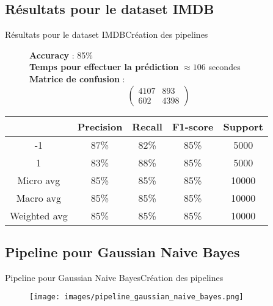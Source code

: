 \documentclass[usenames,dvipsnames]{beamer}
\begin{document}
\subsection{Résultats pour le dataset IMDB}
\begin{frame}{Résultats pour le dataset IMDB}{Création des pipelines}
\begin{figure}[!ht]
  \centering
  \textbf{Accuracy} : 85\% \\
  \textbf{Temps pour effectuer la prédiction} $\approx106$ secondes \\
  \textbf{Matrice de confusion} :
  $$
  \begin{pmatrix}
  4107 & 893 \\
  602 & 4398
  \end{pmatrix}
  $$
\end{figure}

\begin{table}
  \centering
  \begin{tabular}{|c||c|c|c|c|}
    \hline
     & \textbf{Precision} & \textbf{Recall} & \textbf{F1-score} & \textbf{Support}\\
    \hline
    \hline
    -1 & 87\% & 82\% & 85\% & 5000\\
    \hline
    1 & 83\% & 88\% & 85\% & 5000\\
    \hline
    Micro avg & 85\% & 85\% & 85\% & 10000\\
    \hline
    Macro avg & 85\% & 85\% & 85\% & 10000\\
    \hline
    Weighted avg & 85\% & 85\% & 85\% & 10000\\
    \hline
  \end{tabular}
\end{table}
\end{frame}

\subsection{Pipeline pour Gaussian Naive Bayes}
\begin{frame}{Pipeline pour Gaussian Naive Bayes}{Création des pipelines}
\begin{figure}[!ht]
  \centering
  \texttt{[image: images/pipeline\_gaussian\_naive\_bayes.png]}
\end{figure}
\end{frame}
\end{document}
